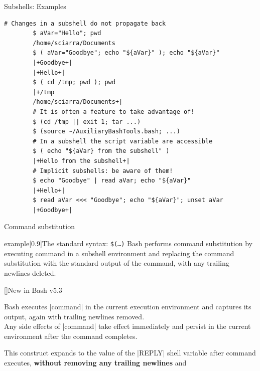 \begin{frame}[fragile]{Subshells: Examples}
    \begin{lstlisting}[style=MyBash]
        # Changes in a subshell do not propagate back
        $ aVar="Hello"; pwd
        /home/sciarra/Documents
        $ ( aVar="Goodbye"; echo "${aVar}" ); echo "${aVar}"
        |+Goodbye+|
        |+Hello+|
        $ ( cd /tmp; pwd ); pwd
        |+/tmp
        /home/sciarra/Documents+|
        # It is often a feature to take advantage of!
        $ (cd /tmp || exit 1; tar ...)
        $ (source ~/AuxiliaryBashTools.bash; ...)
        # In a subshell the script variable are accessible
        $ ( echo "${aVar} from the subshell" )
        |+Hello from the subshell+|
        # Implicit subshells: be aware of them!
        $ echo "Goodbye" | read aVar; echo "${aVar}"
        |+Hello+|
        $ read aVar <<< "Goodbye"; echo "${aVar}"; unset aVar
        |+Goodbye+|
    \end{lstlisting}
    \PrepareURLsymbol[PB]
\end{frame}
\begin{frame}{Command substitution}
    \vspace{-1mm}
    \begin{varblock}{example}[0.9\textwidth]{The standard syntax: \texttt{\$(\ldots)}}
        Bash performs command substitution by executing command in a subshell environment and replacing the command substitution with the standard output of the command, with any trailing newlines deleted.
    \end{varblock}
    \begin{varblock}{}[\textwidth]{New in Bash v5.3}
        \begin{description}
            \item[\texttt{\$\{ command; \}}]
                Bash executes \bash|command| in the current execution environment and captures its output, again with trailing newlines removed.\\
                Any side effects of \bash|command| take effect immediately and persist in the current environment after the command completes.
            \item[\texttt{\$\{| command; \}}]
                This construct expands to the value of the \bash|REPLY| shell variable after command executes, \textbf{without removing any trailing newlines} and 
        \end{description}
    \end{varblock}
\end{frame}
